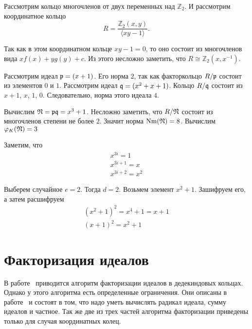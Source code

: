 \documentclass[_00_dissertation.tex]{subfiles}
\begin{document}
\begin{example}
    Рассмотрим кольцо многочленов от двух переменных над $\mathbb{Z}_2$. И рассмотрим координатное кольцо
    \begin{equation*}
        R = \frac{\mathbb{Z}_2(x, y)}{\langle xy - 1\rangle}.
    \end{equation*}
    
    Так как в этом координатном кольце $xy - 1 = 0$, то оно состоит из многочленов вида $xf(x) + yg(y) + c$.
    Из этого несложно заметить, что $R \cong \mathbb{Z}_2(x, x^{-1})$.
    
    Рассмотрим идеал $\mathfrak{p} = (x + 1)$.
    Его норма $2$, так как факторкольцо $R/\mathfrak{p}$ состоит из элементов $0$ и $1$.
    Рассмотрим идеал $\mathfrak{q} = (x^2 + x + 1)$.
    Кольцо $R/\mathfrak{q}$ состоит из $x+1$, $x$, $1$, $0$.
    Следовательно, норма этого идеала $4$.

    Вычислим $\mathfrak{N} = \mathfrak{p}\mathfrak{q} = x^3 + 1$.
    Несложно заметить, что $R/\mathfrak{N}$ состоит из многочленов степени не более $2$.
    Значит норма $\textrm{Nm}(\mathfrak{N}) = 8$.
    Вычислим $\varphi_K(\mathfrak{N}) = 3$

    Заметим, что
    \begin{equation*}
    	\begin{array}{l}
    		x^{3i} = 1\\
    		x^{3i+1} = x\\
    		x^{3i+2} = x^2
    	\end{array}
    \end{equation*}

    Выберем случайное $e = 2$.
    Тогда $d = 2$.
    Возьмем элемент $x^2 + 1$.
    Зашифруем его, а затем расшифруем
    \begin{equation*}
        \begin{split}
            (x^2 + 1)^2 = x^4 + 1 = x + 1\\
            (x + 1)^2 = x^2 + 1
        \end{split}
    \end{equation*}
\end{example}

\section{Факторизация идеалов}

В работе~\cite{source:Darkey-Mensah} приводится алгоритм факторизации идеалов в дедекиндовых кольцах.
Однако у этого алгоритма есть определенные ограничения.
Они описаны в работе~\cite{source:Darkey-Mensah} и состоят в том, что надо уметь вычислять радикал идеала, сумму идеалов и частное.
Так же две из трех частей алгоритма факторизации приведены только для случая координатных колец.
\end{document}
